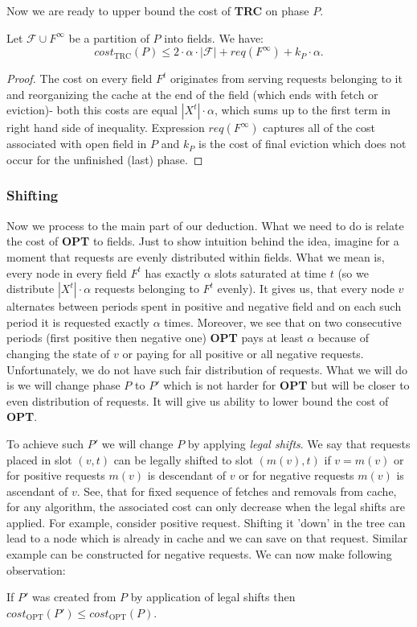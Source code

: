Now we are ready to upper bound the cost of \textbf{TRC} on phase $P$.
\begin{lemma}
Let $\mathcal{F} \cup F^{\infty}$ be a partition of $P$ into fields. We have:
$$cost_{\mathrm{TRC}}(P) \leq 2 \cdot \alpha \cdot |\mathcal{F}| + 
req(F^{\infty}) + k_P \cdot 
\alpha.$$ 
\label{thm:trc_cost}
\end{lemma}
\begin{proof}
The cost on every field $F^t$ originates from serving requests belonging 
to it 
and reorganizing the cache at the end of the field (which ends with fetch or 
eviction)- both this costs are equal 
$|X^t| \cdot \alpha$, which sums up to the first term in right hand side of 
inequality. Expression $req(F^{\infty})$ captures all of the cost associated 
with open field in $P$ and $k_P$ is the cost of final eviction which does not 
occur for the unfinished (last) phase. 
\end{proof}

\subsubsection{Shifting}
Now we process to the main part of our deduction. What we need to do is 
relate the cost of \textbf{OPT} to fields. Just to show intuition behind the 
idea, imagine 
for a moment that requests are evenly distributed within fields. What we mean 
is, every node in every field $F^t$ has exactly $\alpha$ slots 
saturated at time $t$ (so we distribute $|X^t| \cdot \alpha$ requests belonging 
to $F^t$ evenly). It gives us, that every node $v$ alternates between 
periods spent in positive and negative field and on each such period it is 
requested exactly $\alpha$ times. Moreover, we see that on two consecutive 
periods 
(first positive then negative one) \textbf{OPT} pays at least $\alpha$ 
because of changing 
the state of $v$ or paying for all positive or all negative requests. 
Unfortunately, we do not have such fair distribution of requests. What we 
will do is 
we will change phase $P$ to $P'$ which is not harder for \textbf{OPT} but will 
be closer to even distribution of requests. It will give us ability to lower 
bound the cost of \textbf{OPT}.

To achieve such $P'$ we will change $P$ by applying \textit{legal shifts}. 
We say that 
requests placed in slot $(v, t)$ can be legally shifted to slot $(m(v), t)$ if 
$v = m(v)$ or for positive requests $m(v)$ is descendant of $v$ or for negative 
requests $m(v)$ is ascendant of $v$. See, that for fixed sequence of fetches 
and 
removals from cache, for any algorithm, the associated cost can only decrease 
when the legal shifts are applied. For example, consider positive request. 
Shifting it 'down' in the tree can lead to a node which is already in cache and 
we can save on that request. Similar example can be constructed for negative 
requests. We can now make following observation:
\begin{observe}
If $P'$ was created from $P$ by application of legal shifts then 
$cost_{\mathrm{OPT}}(P') \leq cost_{\mathrm{OPT}}(P)$.
\end{observe}

